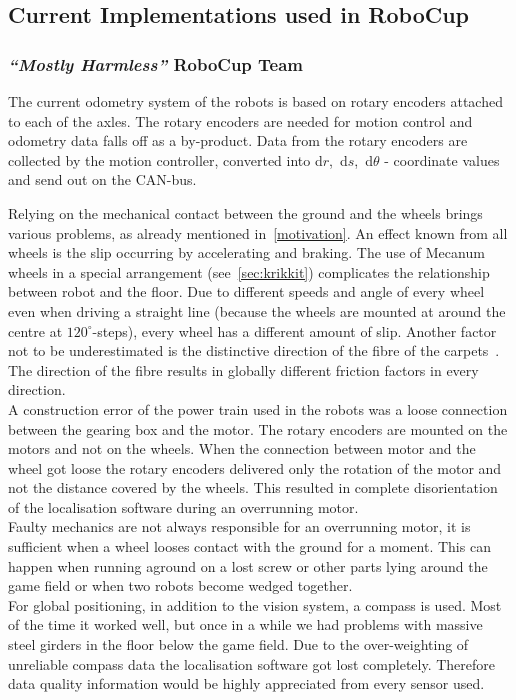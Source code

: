 \documentclass[12pt,a4paper]{article}
\newcommand{\MH}{\emph{``Mostly Harmless''} RoboCup Team\xspace}
\begin{document}
\subsection{Current Implementations used in RoboCup}

\subsubsection{\MH}

The current odometry system of the robots is based on rotary encoders attached to each of the axles. 
The rotary encoders are needed for motion control and odometry data falls off as a by-product.
Data from the rotary encoders are collected by the motion controller, converted into d$r$,~d$s$,~d$\theta$ - coordinate values and send out on the CAN-bus.

Relying on the mechanical contact between the ground and the wheels brings various problems, as already mentioned in~\autoref{motivation}.
An effect known from all wheels is the slip occurring by accelerating and braking.
The use of Mecanum wheels in a special arrangement (see~\autoref{sec:krikkit}) complicates the relationship between robot and the floor. %
Due to different speeds and angle of every wheel even when driving a straight line (because the wheels are mounted at around the centre at $120^\circ$\mbox{-}steps), every wheel has a different amount of slip.
Another factor not to be underestimated is the distinctive direction of the fibre of the carpets~\cite{mecanum2007}.
The direction of the fibre results in globally different friction factors in every direction.\\
A construction error of the power train used in the %
robots was a loose connection between the gearing box and the motor.
The rotary encoders are mounted on the motors and not on the wheels.
When the connection between motor and the wheel got loose the rotary encoders delivered only the rotation of the motor and not the distance covered by the wheels. 
This resulted in complete disorientation of the localisation software during an overrunning motor.\\
Faulty mechanics are not always responsible for an overrunning motor, it is sufficient when a wheel looses contact with the ground for a moment.
This can happen when running aground on a lost screw or other parts lying around the game field or when two robots become wedged together.\\
For global positioning, in addition to the vision system, a compass is used.
Most of the time it worked well, but once in a while we had problems with massive steel girders in the floor below the game field.
Due to the over-weighting of unreliable compass data the localisation software got lost completely.
Therefore data quality information would be highly appreciated from every sensor used.
\end{document}
